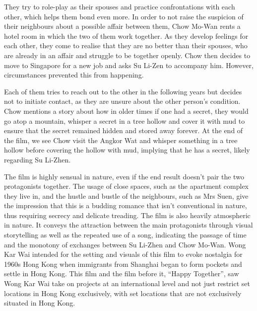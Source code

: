 \begin{multicols}{2}
They try to role-play as their spouses and practice confrontations with each other, which helps them bond even more. In order to not raise the suspicion of their neighbours about a possible affair between them, Chow Mo-Wan rents a hotel room in which the two of them work together. As they develop feelings for each other, they come to realise that they are no better than their spouses, who are already in an affair and struggle to be together openly. Chow then decides to move to Singapore for a new job and asks Su Li-Zen to accompany him. However, circumstances prevented this from happening.

Each of them tries to reach out to the other in the following years but decides not to initiate contact, as they are unsure about the other person's condition. Chow mentions a story about how in older times if one had a secret, they would go atop a mountain, whisper a secret in a tree hollow and cover it with mud to ensure that the secret remained hidden and stored away forever. At the end of the film, we see Chow visit the Angkor Wat and whisper something in a tree hollow before covering the hollow with mud, implying that he has a secret, likely regarding Su Li-Zhen.

The film is highly sensual in nature, even if the end result doesn't pair the two protagonists together. The usage of close spaces, such as the apartment complex they live in, and the hustle and bustle of the neighbours, such as Mrs Suen, give the impression that this is a budding romance that isn't conventional in nature, thus requiring secrecy and delicate treading. The film is also heavily atmospheric in nature. It conveys the attraction between the main protagonists through visual storytelling as well as the repeated use of a song, indicating the passage of time and the monotony of exchanges between Su Li-Zhen and Chow Mo-Wan. Wong Kar Wai intended for the setting and visuals of this film to evoke nostalgia for 1960s Hong Kong when immigrants from Shanghai began to form pockets and settle in Hong Kong. This film and the film before it, “Happy Together”, saw Wong Kar Wai take on projects at an international level and not just restrict set locations in Hong Kong exclusively, with set locations that are not exclusively situated in Hong Kong.

\end{multicols}